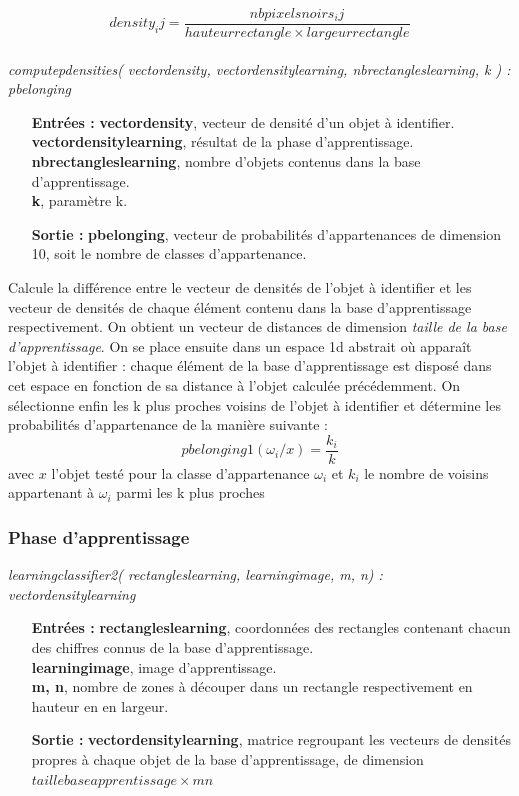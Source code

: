 $$density_ij = \frac{nb pixels noirs_ij}{hauteur rectangle \times largeur rectangle}$$\\

\textit{computepdensities( vectordensity, vectordensitylearning, nbrectangleslearning, k ) : pbelonging}\\
\begin{itemize}
	\item[\textbf{Entrées :}] \textbf{vectordensity}, vecteur de densité d'un objet à identifier.\\\textbf{vectordensitylearning}, résultat de la phase d'apprentissage. \\\textbf{nbrectangleslearning}, nombre d'objets contenus dans la base d'apprentissage.\\\textbf{k}, paramètre k.
	\item[\textbf{Sortie :}] \textbf{pbelonging}, vecteur de probabilités d'appartenances de dimension 10, soit le nombre de classes d'appartenance.
\end{itemize}
Calcule la différence entre le vecteur de densités de l'objet à identifier et les vecteur de densités de chaque élément contenu dans la base d'apprentissage respectivement. On obtient un vecteur de distances de dimension \textit{taille de la base d'apprentissage}. On se place ensuite dans un espace 1d abstrait où apparaît l'objet à identifier : chaque élément de la base d'apprentissage est disposé dans cet espace en fonction de sa distance à l'objet calculée précédemment.
On sélectionne enfin les k plus proches voisins de l'objet à identifier et détermine les probabilités d'appartenance de la manière suivante :
$$pbelonging1(\omega_i/x) = \frac{k_i}{k}$$
avec $x$ l'objet testé pour la classe d'appartenance $\omega_i$ et $k_i$ le nombre de voisins appartenant à $\omega_i$ parmi les k plus proches

\subsubsection{Phase d'apprentissage}

\textit{learningclassifier2( rectangleslearning, learningimage, m, n) : vectordensitylearning}
\\
\begin{itemize}
	\item[\textbf{Entrées :}] \textbf{rectangleslearning}, coordonnées des rectangles contenant chacun des chiffres connus de la base d'apprentissage. \\\textbf{learningimage}, image d'apprentissage. \\\textbf{m, n}, nombre de zones à découper dans un rectangle respectivement en hauteur en en largeur.
	\item[\textbf{Sortie :}] \textbf{vectordensitylearning}, matrice regroupant les vecteurs de densités propres à chaque objet de la base d'apprentissage, de dimension $taille base apprentissage \times mn$
\end{itemize}

